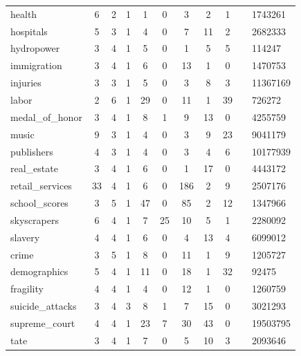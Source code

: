\begin{figure*}
\begin{tabular}{ l | c c | c c c c c c |}
health & 6 & 2 & 1 & 1 & 0 & 3 & 2 & 1 &  & 1743261\\
hospitals & 5 & 3 & 1 & 4 & 0 & 7 & 11 & 2 &  & 2682333\\
hydropower & 3 & 4 & 1 & 5 & 0 & 1 & 5 & 5 &  & 114247\\
immigration & 3 & 4 & 1 & 6 & 0 & 13 & 1 & 0 &  & 1470753\\
injuries & 3 & 3 & 1 & 5 & 0 & 3 & 8 & 3 &  & 11367169\\
labor & 2 & 6 & 1 & 29 & 0 & 11 & 1 & 39 &  & 726272\\
medal_of_honor & 3 & 4 & 1 & 8 & 1 & 9 & 13 & 0 &  & 4255759\\
music & 9 & 3 & 1 & 4 & 0 & 3 & 9 & 23 &  & 9041179\\
publishers & 4 & 3 & 1 & 4 & 0 & 3 & 4 & 6 &  & 10177939\\
real_estate & 3 & 4 & 1 & 6 & 0 & 1 & 17 & 0 &  & 4443172\\
retail_services & 33 & 4 & 1 & 6 & 0 & 186 & 2 & 9 &  & 2507176\\
school_scores & 3 & 5 & 1 & 47 & 0 & 85 & 2 & 12 &  & 1347966\\
skyscrapers & 6 & 4 & 1 & 7 & 25 & 10 & 5 & 1 &  & 2280092\\
slavery & 4 & 4 & 1 & 6 & 0 & 4 & 13 & 4 &  & 6099012\\
crime & 3 & 5 & 1 & 8 & 0 & 11 & 1 & 9 &  & 1205727\\
demographics & 5 & 4 & 1 & 11 & 0 & 18 & 1 & 32 &  & 92475\\
fragility & 4 & 4 & 1 & 4 & 0 & 12 & 1 & 0 &  & 1260759\\
suicide_attacks & 3 & 4 & 3 & 8 & 1 & 7 & 15 & 0 &  & 3021293\\
supreme_court & 4 & 4 & 1 & 23 & 7 & 30 & 43 & 0 &  & 19503795\\
tate & 3 & 4 & 1 & 7 & 0 & 5 & 10 & 3 &  & 2093646\\
\end{tabular}
\end{figure*}


